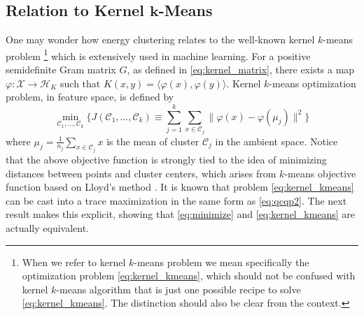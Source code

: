 \documentclass[aps,preprint,nofootinbib,floatfix]{revtex4-1}
\newcommand\kk{K}
\newcommand\HH{\mathcal{H}}
\newcommand\C{{\mathcal{C}}}
\begin{document}
\subsection*{Relation to Kernel $\bm{k}$-Means}

One may wonder how energy clustering 
relates to the well-known kernel $k$-means problem%
\footnote{When we refer to kernel $k$-means problem we mean specifically 
the optimization problem \eqref{eq:kernel_kmeans}, which should not be 
confused with kernel $k$-means algorithm that is just one possible recipe 
to solve \eqref{eq:kernel_kmeans}. The distinction should also be clear
from the context.} 
which is extensively used in machine learning.
For a positive semidefinite Gram matrix $G$, as defined in
\eqref{eq:kernel_matrix},
there exists a map
$\varphi: \mathcal{X} \to \HH_\kk$ such that
$\kk(x,y) = \langle \varphi(x), \varphi(y) \rangle$. 
Kernel $k$-means optimization
problem,
in feature space,
is defined by
\begin{equation}
\label{eq:kernel_kmeans}
\min_{\C_1,\dotsc,\C_k}\bigg\{ 
J(\C_1,\dots,\C_k) \equiv  \sum_{j=1}^k
\sum_{x \in \C_j} \| \varphi(x) - \varphi(\mu_j) \|^2
\bigg\}
\end{equation}
where $\mu_j = \tfrac{1}{n_j} \sum_{x \in \C_j} x$ is the  mean of cluster
$\C_j$ in the ambient space. Notice that the above objective function
is strongly tied to the idea of minimizing distances between points
and cluster centers, which arises from $k$-means objective function based
on Lloyd's method \cite{Lloyd}.
It is known \cite{Dhillon2,Dhillon}
that problem \eqref{eq:kernel_kmeans} 
can be cast into a trace maximization in the same form as 
\eqref{eq:qcqp2}. The next result makes this explicit, showing that
\eqref{eq:minimize} and \eqref{eq:kernel_kmeans} are actually equivalent.
\end{document}
